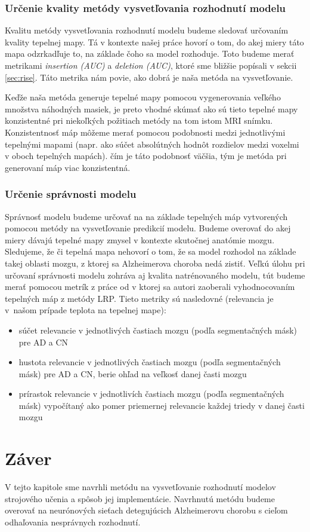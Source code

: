 \subsubsection{Určenie kvality metódy vysvetľovania rozhodnutí modelu \label{sec:evaluation_design_method_quality}}

Kvalitu metódy vysvetľovania rozhodnutí modelu budeme sledovať určovaním kvality tepelnej mapy. Tá v kontexte našej práce hovorí o tom, do akej miery táto mapa odzrkadľuje to, na základe čoho sa model rozhoduje. Toto budeme merať metrikami \textit{insertion (AUC)} a \textit{deletion (AUC)}, ktoré sme bližšie popísali v sekcii \ref{sec:rise}. Táto metrika nám povie, ako dobrá je naša metóda na vysvetľovanie.

Keďže naša metóda generuje tepelné mapy pomocou vygenerovania veľkého množstva náhodných masiek, je preto vhodné skúmať ako sú tieto tepelné mapy konzistentné pri niekoľkých požitiach metódy na tom istom MRI snímku. Konzistentnosť máp môžeme merať pomocou podobnosti medzi jednotlivými tepelnými mapami (napr. ako súčet absolútných hodnôt rozdielov medzi voxelmi v oboch tepelných mapách). čím je táto podobnosť väčšia, tým je metóda pri generovaní máp viac konzistentná.

\subsubsection{Určenie správnosti modelu}

Správnosť modelu budeme určovať na na základe tepelných máp vytvorených pomocou metódy na vysvetľovanie predikcií modelu. Budeme overovať do akej miery dávajú tepelné mapy zmysel v kontexte skutočnej anatómie mozgu. Sledujeme, že či tepelná mapa nehovorí o tom, že sa model rozhodol na základe takej oblasti mozgu, z ktorej sa Alzheimerova choroba nedá zistiť. Veľkú úlohu pri určovaní správnosti modelu zohráva aj kvalita natrénovaného modelu, tút budeme merať pomocou metrík z práce od \citeauthor*{bohle2019layer} v ktorej sa autori zaoberali vyhodnocovaním tepelných máp z metódy LRP. Tieto metriky sú nasledovné (relevancia je v našom prípade teplota na tepelnej mape):

\begin{itemize}
    \item súčet relevancie v jednotlivých častiach mozgu (podľa segmentačných másk) pre AD a CN
    \item hustota relevancie v jednotlivých častiach mozgu (podľa segmentačných másk) pre AD a CN, berie ohľad na veľkosť danej časti mozgu
    \item prírastok relevancie v jednotlivích častiach mozgu (podľa segmentačných másk) vypočítaný ako pomer priemernej relevancie každej triedy v danej časti mozgu
\end{itemize}

\section{Záver}

V tejto kapitole sme navrhli metódu na vysvetľovanie rozhodnutí modelov strojového učenia a spôsob jej implementácie. Navrhnutú metódu budeme overovať na neurónových sieťach detegujúcich Alzheimerovu chorobu s cieľom odhaľovania nesprávnych rozhodnutí.
